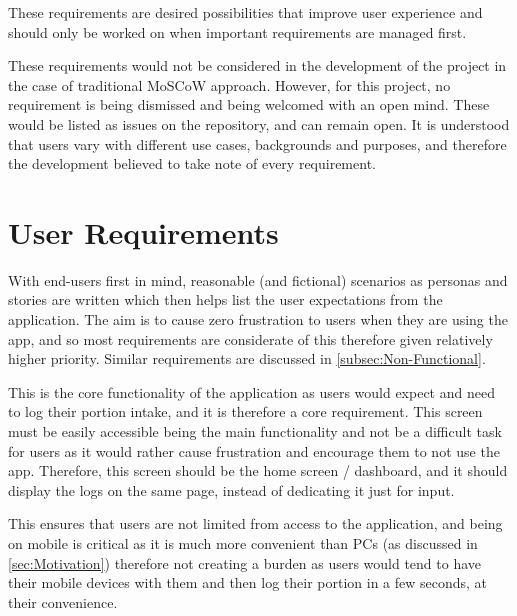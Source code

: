 \documentclass[../main.tex]{subfiles}
\begin{document}

These requirements are desired possibilities that improve user experience and should only be worked on when important requirements are managed first.


These requirements would not be considered in the development of the project in the case of traditional MoSCoW approach. However, for this project, no requirement is being dismissed and being welcomed with an open mind. These would be listed as issues on the repository, and can remain open. It is understood that users vary with different use cases, backgrounds and purposes, and therefore the development believed to take note of every requirement.

\section{User Requirements}

With end-users first in mind, reasonable (and fictional) scenarios as personas and stories are written \cite{wikiUsers} which then helps list the user expectations from the application. The aim is to cause zero frustration to users when they are using the app, and so most requirements are considerate of this therefore given relatively higher priority. Similar requirements are discussed in \ref{subsec:Non-Functional}.


This is the core functionality of the application as users would expect and need to log their portion intake, and it is therefore a core requirement. This screen must be easily accessible being the main functionality and not be a difficult task for users as it would rather cause frustration and encourage them to not use the app. Therefore, this screen should be the home screen / dashboard, and it should display the logs on the same page, instead of dedicating it just for input.


This ensures that users are not limited from access to the application, and being on mobile is critical as it is much more convenient than PCs (as discussed in \ref{sec:Motivation}) therefore not creating a burden as users would tend to have their mobile devices with them and then log their portion in a few seconds, at their convenience.
\end{document}
